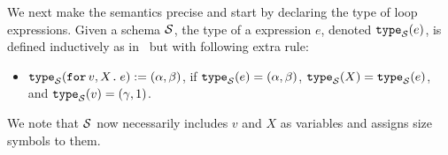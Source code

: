 We next make the semantics precise and start by
declaring the type of loop expressions.
Given a schema $\mathcal{S}$, the type of a \langfor expression $e$, denoted $\texttt{type}_{\mathcal{S}}(e)$, is defined inductively as in \lang\, but with following extra rule:
\begin{itemize}\setlength{\itemindent}{-2ex}
\item $\texttt{type}_{\mathcal{S}}(\texttt{for}\, v,X \texttt{.}\, e) := (\alpha,\beta)$, if $\texttt{type}_{\mathcal{S}}(e)=(\alpha,\beta)$,
$\texttt{type}_{\mathcal{S}}(X) = \texttt{type}_{\mathcal{S}}(e)$, and $\texttt{type}_{\mathcal{S}}(v) = (\gamma,1)$.
\end{itemize}
We note that $\mathcal{S}$ now necessarily includes $v$ and $X$ as variables and assigns size symbols to them.

